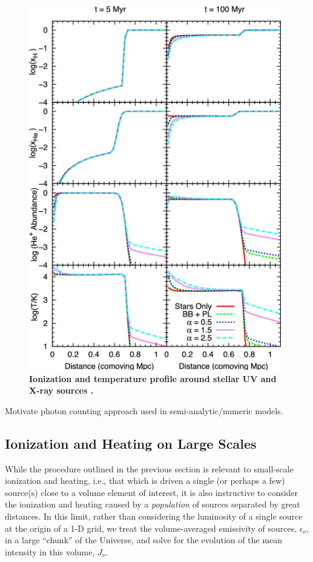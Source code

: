 \begin{figure}[]
\begin{center}
\includegraphics[width=0.98\textwidth]{Mirocha/knevitt2014_fig3.pdf}
\end{center}
\caption{{\bf Ionization and temperature profile around stellar UV and X-ray sources \cite{Knevitt2014}.}}
\label{fig:fzh04}
\end{figure}

{\color{red} Motivate photon counting approach used in semi-analytic/numeric models.}


\subsection{Ionization and Heating on Large Scales} \label{sec:largescales}
While the procedure outlined in the previous section is relevant to small-scale ionization and heating, i.e., that which is driven a single (or perhaps a few) source(s) close to a volume element of interest, it is also instructive to consider the ionization and heating caused by a \textit{population} of sources separated by great distances. In this limit, rather than considering the luminosity of a single source at the origin of a 1-D grid, we treat the volume-averaged emissivity of sources, $\epsilon_{\nu}$, in a large ``chunk'' of the Universe, and solve for the evolution of the mean intensity in this volume, $J_{\nu}$.

